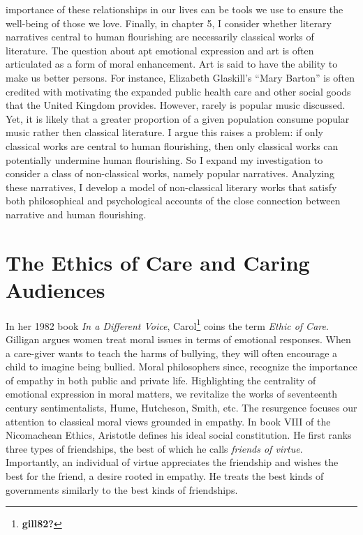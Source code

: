 \documentclass[
  12pt,
]{book}
\theoremstyle{definition}
\theoremstyle{definition}
\theoremstyle{definition}
\theoremstyle{definition}
\theoremstyle{remark}
\begin{document}
importance of these relationships in our lives can be tools we use to ensure the well-being of those we love. Finally, in chapter 5, I consider whether literary narratives central to human flourishing are necessarily classical works of literature. The question about apt emotional expression and art is often articulated as a form of moral enhancement. Art is said to have the ability to make us better persons. For instance, Elizabeth Glaskill's ``Mary Barton'' is often credited with motivating the expanded public health care and other social goods that the United Kingdom provides. However, rarely is popular music discussed. Yet, it is likely that a greater proportion of a given population consume popular music rather then classical literature. I argue this raises a problem: if only classical works are central to human flourishing, then only classical works can potentially undermine human flourishing. So I expand my investigation to consider a class of non-classical works, namely popular narratives. Analyzing these narratives, I develop a model of non-classical literary works that satisfy both philosophical and psychological accounts of the close connection between narrative and human flourishing.

\section{The Ethics of Care and Caring Audiences}\label{the-ethics-of-care-and-caring-audiences}

In her 1982 book \emph{In a Different Voice}, Carol\footnote{\textbf{gill82?}} coins the term \emph{Ethic of Care}. Gilligan argues women treat moral issues in terms of emotional responses. When a care-giver wants to teach the harms of bullying, they will often encourage a child to imagine being bullied. Moral philosophers since, recognize the importance of empathy in both public and private life. Highlighting the centrality of emotional expression in moral matters, we revitalize the works of seventeenth century sentimentalists, Hume, Hutcheson, Smith, etc. The resurgence focuses our attention to classical moral views grounded in empathy. In book VIII of the Nicomachean Ethics, Aristotle defines his ideal social constitution. He first ranks three types of friendships, the best of which he calls \emph{friends of virtue}. Importantly, an individual of virtue appreciates the friendship and wishes the best for the friend, a desire rooted in empathy. He treats the best kinds of governments similarly to the best kinds of friendships.
\end{document}
